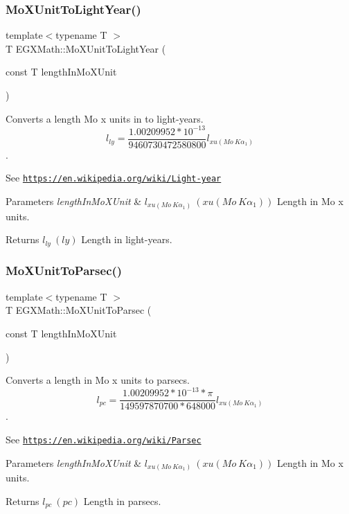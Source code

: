 \subsubsection{\texorpdfstring{Mo\+X\+Unit\+To\+Light\+Year()}{MoXUnitToLightYear()}}
{\footnotesize\ttfamily template$<$typename T $>$ \\
T E\+G\+X\+Math\+::\+Mo\+X\+Unit\+To\+Light\+Year (\begin{DoxyParamCaption}\item[{const T}]{length\+In\+Mo\+X\+Unit }\end{DoxyParamCaption})}



Converts a length Mo x units in to light-\/years. \[ l_{ly}= \frac{1.00209952*10^{-13}}{9460730472580800} l_{xu(Mo\ K\alpha_1)} \]. 

See \href{https://en.wikipedia.org/wiki/Light-year}{\tt https\+://en.\+wikipedia.\+org/wiki/\+Light-\/year} 
\begin{DoxyParams}{Parameters}
{\em length\+In\+Mo\+X\+Unit} & $ l_{xu(Mo\ K\alpha_1)}\ (xu(Mo\ K\alpha_1))$ Length in Mo x units. \\
\hline
\end{DoxyParams}
\begin{DoxyReturn}{Returns}
$ l_{ly}\ (ly)$ Length in light-\/years. 
\end{DoxyReturn}
\mbox{\label{group___e_g_x_math-_conversions-_length_conversions-_non-_s_i-_mo_x_unit-_astronomical_ga257eaf0a2f8f74aca2917964524d486d}} 
\subsubsection{\texorpdfstring{Mo\+X\+Unit\+To\+Parsec()}{MoXUnitToParsec()}}
{\footnotesize\ttfamily template$<$typename T $>$ \\
T E\+G\+X\+Math\+::\+Mo\+X\+Unit\+To\+Parsec (\begin{DoxyParamCaption}\item[{const T}]{length\+In\+Mo\+X\+Unit }\end{DoxyParamCaption})}



Converts a length in Mo x units to parsecs. \[ l_{pc}=\frac{1.00209952*10^{-13} * \pi}{149597870700 * 648000} l_{xu(Mo\ K\alpha_1)} \]. 

See \href{https://en.wikipedia.org/wiki/Parsec}{\tt https\+://en.\+wikipedia.\+org/wiki/\+Parsec} 
\begin{DoxyParams}{Parameters}
{\em length\+In\+Mo\+X\+Unit} & $ l_{xu(Mo\ K\alpha_1)}\ (xu(Mo\ K\alpha_1))$ Length in Mo x units. \\
\hline
\end{DoxyParams}
\begin{DoxyReturn}{Returns}
$ l_{pc}\ (pc)$ Length in parsecs. 
\end{DoxyReturn}
